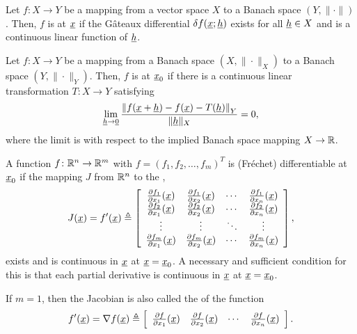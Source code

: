 \begin{definition}
Let $f \colon X \rightarrow Y$ be a mapping from a vector space $X$ to a Banach space $(Y,\|\cdot\|)$.
Then, $f$ is  at $\underline{x}$ if the G\^{a}teaux differential $\delta f (\underline{x};\underline{h})$ exists for all $\underline{h} \in X$ and is a continuous linear function of $\underline{h}$.
\end{definition}

\begin{definition}
Let $f \colon X \rightarrow Y$ be a mapping from a Banach space $(X,\|\cdot\|_X)$ to a Banach space $(Y,\|\cdot\|_Y)$.
Then, $f$ is  at $\underline{x}_0$ if there is a continuous linear transformation $T\colon X \to Y$ satisfying
\[ \lim_{\underline{h} \to \underline{0}} \frac{\left\|f(\underline{x}+ \underline{h}) - f(\underline{x}) - T(\underline{h}) \right\|_Y}{\| \underline{h} \|_X} = 0, \]
where the limit is with respect to the implied Banach space mapping $X\to \mathbb{R}$.
\end{definition}

\begin{example}
A function $f\colon \mathbb{R}^n \to \mathbb{R}^m$ with $f = (f_1,f_2,\ldots,f_m)^T$ is (Fr\'{e}chet) differentiable at $\underline{x}_0$ if the mapping $J$ from $\mathbb{R}^n$ to the ,
\[ J(\underline{x})=f'(\underline{x}) \triangleq \left[ \begin{array}{cccc} \frac{\partial  f_1}{\partial  x_1} (\underline{x}) & \frac{\partial  f_1}{\partial  x_2} (\underline{x}) & \cdots & \frac{\partial  f_1}{\partial  x_n} (\underline{x}) \\
\frac{\partial  f_2}{\partial  x_1} (\underline{x}) & \frac{\partial  f_2}{\partial  x_2} (\underline{x}) & \cdots & \frac{\partial  f_2}{\partial  x_n} (\underline{x}) \\
\vdots & \vdots & \ddots & \vdots \\
\frac{\partial  f_m}{\partial  x_1} (\underline{x}) & \frac{\partial  f_m}{\partial  x_2} (\underline{x}) & \cdots & \frac{\partial  f_m}{\partial  x_n} (\underline{x}) \end{array} \right], \]
exists and is continuous in $\underline{x}$ at $\underline{x}=\underline{x}_0$.
A necessary and sufficient condition for this is that each partial derivative is continuous in $\underline{x}$ at $\underline{x}=\underline{x}_0$.

If $m=1$, then the Jacobian is also called the  of the function
\[ f'(\underline{x}) = \nabla f(\underline{x}) \triangleq \left[ \begin{array}{cccc} \frac{\partial  f}{\partial  x_1} (\underline{x}) & \frac{\partial  f}{\partial  x_2} (\underline{x}) & \cdots & \frac{\partial  f}{\partial  x_n} (\underline{x}) \end{array} \right]. \]
\end{example}

